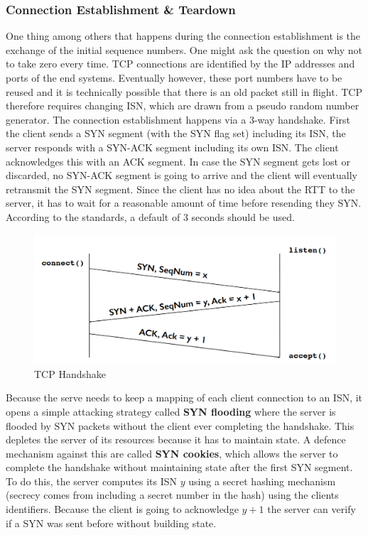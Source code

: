 \subsubsection{Connection Establishment \& Teardown}
One thing among others that happens during the connection establishment is the exchange of the initial sequence numbers. One might ask the question on why not to take zero every time. TCP connections are identified by the IP addresses and ports of the end systems. Eventually however, these port numbers have to be reused and it is technically possible that there is an old packet still in flight. TCP therefore requires changing ISN, which are drawn from a pseudo random number generator. The connection establishment happens via a 3-way handshake. First the client sends a SYN segment (with the SYN flag set) including its ISN, the server responds with a SYN-ACK segment including its own ISN. The client acknowledges this with an ACK segment. In case the SYN segment gets lost or discarded, no SYN-ACK segment is going to arrive and the client will eventually retransmit the SYN segment. Since the client has no idea about the RTT to the server, it has to wait for a reasonable amount of time before resending they SYN. According to the standards, a default of 3 seconds should be used.
\begin{figure}[H]
\centering
\includegraphics[width=.6\textwidth]{images/tcp_handshake.PNG}
\caption{TCP Handshake}
\label{tcp_handshake}
\end{figure}
Because the serve needs to keep a mapping of each client connection to an ISN, it opens a simple attacking strategy called \textbf{SYN flooding} where the server is flooded by SYN packets without the client ever completing the handshake. This depletes the server of its resources because it has to maintain state. A defence mechanism against this are called \textbf{SYN cookies}, which allows the server to complete the handshake without maintaining state after the first SYN segment. To do this, the server computes its ISN $y$ using a secret hashing mechanism (secrecy comes from including a secret number in the hash) using the clients identifiers. Because the client is going to acknowledge $y + 1$ the server can verify if a SYN was sent before without building state. \vspace{.3cm}\\

